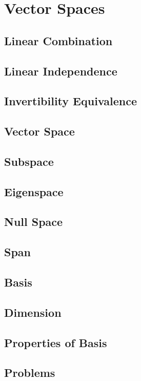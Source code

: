 \chapter{Vector Spaces}

\section{Linear Combination}

\section{Linear Independence}

\section{Invertibility Equivalence}

\section{Vector Space}

\section{Subspace}

\section{Eigenspace}

\section{Null Space}

\section{Span}

\section{Basis}

\section{Dimension}

\section{Properties of Basis}

\section{Problems}